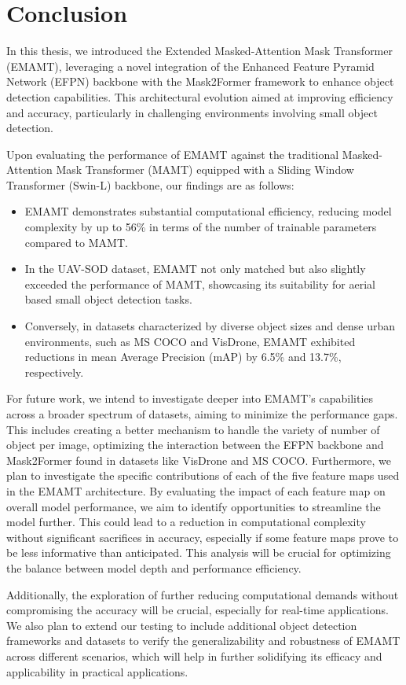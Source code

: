 \chapter{Conclusion}

In this thesis, we introduced the Extended Masked-Attention Mask Transformer (EMAMT), leveraging a novel integration of the 
Enhanced Feature Pyramid Network (EFPN) backbone with the Mask2Former framework to enhance object detection capabilities. 
This architectural evolution aimed at improving efficiency and accuracy, particularly in challenging environments involving small object detection.

Upon evaluating the performance of EMAMT against the traditional Masked-Attention Mask Transformer (MAMT) equipped with a Sliding Window Transformer (Swin-L) 
backbone, our findings are as follows:

\begin{itemize}
    \item EMAMT demonstrates substantial computational efficiency, reducing model complexity by up to 56\% in terms of the number of trainable parameters compared to MAMT.
    \item In the UAV-SOD dataset, EMAMT not only matched but also slightly exceeded the performance of MAMT, showcasing its suitability for aerial based small object detection tasks.
    \item Conversely, in datasets characterized by diverse object sizes and dense urban environments, such as MS COCO and VisDrone, EMAMT exhibited reductions in mean Average Precision (mAP) by 6.5\% and 13.7\%, respectively. 
\end{itemize}

For future work, we intend to investigate deeper into EMAMT’s capabilities across a broader spectrum of datasets, aiming to minimize the performance gaps. 
This includes creating a better mechanism to handle the variety of number of object per image, optimizing the interaction between the EFPN backbone and Mask2Former 
found in datasets like VisDrone and MS COCO. Furthermore, we plan to investigate the specific contributions of each of the five feature maps used in the EMAMT architecture. 
By evaluating the impact of each feature map on overall model performance, we aim to identify opportunities to streamline the model further. This could lead to a 
reduction in computational complexity without significant sacrifices in accuracy, especially if some feature maps prove to be less informative than anticipated. 
This analysis will be crucial for optimizing the balance between model depth and performance efficiency.

Additionally, the exploration of further reducing computational demands without compromising the accuracy will be crucial, especially for real-time applications. 
We also plan to extend our testing to include additional object detection frameworks and datasets to verify the generalizability and robustness of EMAMT across 
different scenarios, which will help in further solidifying its efficacy and applicability in practical applications.


